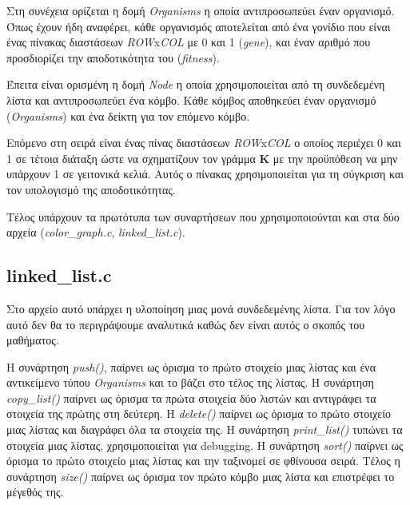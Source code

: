 \documentclass{article}
\begin{document}
Στη συνέχεια ορίζεται η δομή \emph{Organisms} η οποία αντιπροσωπεύει έναν
οργανισμό. Όπως έχουν ήδη αναφέρει, κάθε οργανισμός αποτελείται από ένα γονίδιο
που είναι ένας πίνακας διαστάσεων \emph{ROW}x\emph{COL} με 0 και 1 (\emph{gene}),
και έναν αριθμό που προσδιορίζει την αποδοτικότητα του (\emph{fitness}).

Έπειτα είναι ορισμένη η δομή \emph{Node} η οποία χρησιμοποιείται από τη
συνδεδεμένη λίστα και αντιπροσωπεύει ένα κόμβο. Κάθε κόμβος αποθηκεύει έναν
οργανισμό (\emph{Organisms}) και ένα δείκτη για τον επόμενο κόμβο.

Επόμενο στη σειρά είναι ένας πίνας διαστάσεων \emph{ROW}x\emph{COL} ο οποίος
περιέχει 0 και 1 σε τέτοια διάταξη ώστε να σχηματίζουν τον γράμμα \textbf{K} με
την προϋπόθεση να μην υπάρχουν 1 σε γειτονικά κελιά. Αυτός ο πίνακας
χρησιμοποιείται για τη σύγκριση και τον υπολογισμό της αποδοτικότητας.

Τέλος υπάρχουν τα πρωτότυπα των συναρτήσεων που χρησιμοποιούνται και στα δύο
αρχεία (\emph{color\_graph.c}, \emph{linked\_list.c}).

\subsection{linked\_list.c}
Στο αρχείο αυτό υπάρχει η υλοποίηση μιας μονά συνδεδεμένης λίστα. Για τον λόγο
αυτό δεν θα το περιγράψουμε αναλυτικά καθώς δεν είναι αυτός ο σκοπός του
μαθήματος.

Η συνάρτηση \emph{push()}, παίρνει ως όρισμα το πρώτο στοιχείο μιας λίστας και
ένα αντικείμενο τύπου \emph{Organisms} και το βάζει στο τέλος της λίστας. Η
συνάρτηση \emph{copy\_list()} παίρνει ως όρισμα τα πρώτα στοιχεία δύο λιστών και
αντιγράφει τα στοιχεία της πρώτης στη δεύτερη. Η \emph{delete()} παίρνει ως
όρισμα το πρώτο στοιχείο μιας λίστας και διαγράφει όλα τα στοιχεία της. Η
συνάρτηση \emph{print\_list()} τυπώνει τα στοιχεία μιας λίστας, χρησιμοποιείται
για debugging. Η συνάρτηση \emph{sort()} παίρνει ως όρισμα το πρώτο στοιχείο
μιας λίστας και την ταξινομεί σε φθίνουσα σειρά. Τέλος η συνάρτηση \emph{size()}
παίρνει ως όρισμα τον πρώτο κόμβο μιας λίστα και επιστρέφει το μέγεθός της.
\end{document}

